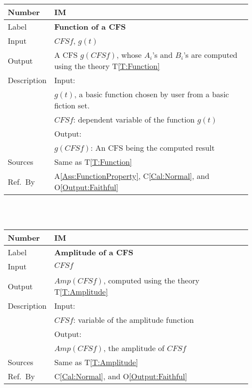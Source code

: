 \documentclass[12pt]{article}
\newcommand{\colAwidth}{0.13\textwidth}
\newcommand{\colBwidth}{0.82\textwidth}
\newcommand{\tref}[1]{T\ref{#1}}
\newcommand{\aref}[1]{A\ref{#1}}
\newcommand{\calref}[1]{C\ref{#1}}
\newcommand{\oref}[1]{O\ref{#1}}
\newcounter{instnum} %
\begin{document}
\noindent
\begin{minipage}{\textwidth}
	\renewcommand*{\arraystretch}{1.5}
	\begin{tabular}{| p{\colAwidth} | p{\colBwidth}|}
		\hline
		\rowcolor[gray]{0.9}
		Number& IM{instnum}\theinstnum \label{IM:Function}\\
		\hline
		Label& \bf Function of a CFS \\
		\hline
		Input& $\mathit{CFSf}$, $g(t)$\\
		\hline
		Output& A CFS $g(CFSf)$, whose $A_i$'s and $B_i$'s are computed using the theory \tref{T:Function}\\
		\hline
		Description&Input:\\
		& $g(t)$, a basic function chosen by user from a basic fiction set.\\
		&$\mathit{CFSf}$: dependent variable of the function $g(t)$\\
		&Output:\\
		& $g(CFSf)$: An CFS being the computed result\\
		\hline
		Sources&Same as \tref{T:Function}		\\
		\hline
		Ref.\ By & \aref{Ass:FunctionProperty}, \calref{Cal:Normal}, and  \oref{Output:Faithful}
		
		
		\\
		\hline
	\end{tabular}
\end{minipage}\\
~\newline

\noindent
\begin{minipage}{\textwidth}
	\renewcommand*{\arraystretch}{1.5}
	\begin{tabular}{| p{\colAwidth} | p{\colBwidth}|}
		\hline
		\rowcolor[gray]{0.9}
		Number& IM{instnum}\theinstnum \label{IM:Amplitude}\\
		\hline
		Label& \bf Amplitude of a CFS \\
		\hline
		Input& $\mathit{CFSf}$\\
		\hline
		Output& $\mathit{Amp}(\mathit{CFSf})$, computed using the theory \tref{T:Amplitude}\\
		\hline
		Description&Input:\\
		&$\mathit{CFSf}$: variable of the amplitude function\\
		&Output:\\
		& $\mathit{Amp}(\mathit{CFSf})$, the amplitude of $\mathit{CFSf}$\\
		\hline
		Sources&Same as \tref{T:Amplitude}		\\
		\hline
		Ref.\ By & \calref{Cal:Normal}, and  \oref{Output:Faithful}
		
		
		\\
		\hline
	\end{tabular}
\end{minipage}\\
~\newline
\end{document}
